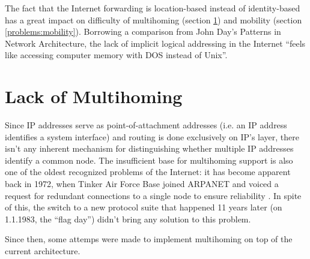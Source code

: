         The fact that the Internet forwarding is location-based instead of identity-based has a great impact on difficulty of multihoming (section \ref{problems:multihoming}) and mobility (section \ref{problems:mobility}). Borrowing a comparison from John Day's Patterns in Network Architecture, the lack of implicit logical addressing in the Internet ``feels like accessing computer memory with DOS instead of Unix''.

    \section{Lack of Multihoming}\label{problems:multihoming}

        Since IP addresses serve as point-of-attachment addresses (i.e. an IP address identifies a system interface) and routing is done exclusively on IP's layer, there isn't any inherent mechanism for distinguishing whether multiple IP addresses identify a common node. The insufficient base for multihoming support is also one of the oldest recognized problems of the Internet: it has become apparent back in 1972, when Tinker Air Force Base joined ARPANET and voiced a request for redundant connections to a single node to ensure reliability \cite{Patterns}. In spite of this, the switch to a new protocol suite that happened 11 years later (on 1.1.1983, the ``flag day'') didn't bring any solution to this problem.

        Since then, some attemps were made to implement multihoming on top of the current architecture.

